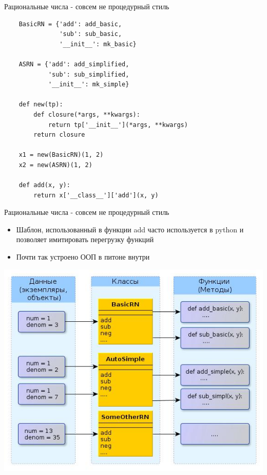 \documentclass{article}
\begin{document}
\begin{center} Рациональные числа - совсем не процедурный стиль \end{center}
\begin{lstlisting}
    BasicRN = {'add': add_basic, 
               'sub': sub_basic,
               '__init__': mk_basic}

    ASRN = {'add': add_simplified, 
            'sub': sub_simplified,
            '__init__': mk_simple}

    def new(tp):
        def closure(*args, **kwargs):
            return tp['__init__'](*args, **kwargs)
        return closure

    x1 = new(BasicRN)(1, 2)
    x2 = new(ASRN)(1, 2)

    def add(x, y):
        return x['__class__']['add'](x, y)
\end{lstlisting}
\newpage

\begin{center} Рациональные числа - совсем не процедурный стиль \end{center}
\begin{itemize}
    \item Шаблон, использованный в функции add часто используется в 
          python и позволяет имитировать перегрузку функций
    \item Почти так устроено ООП в питоне внутри
\end{itemize}
\newpage

\begin{center} \includegraphics[scale=0.8]{images/oop_style.jpg} \end{center} 
\newpage
\end{document}
